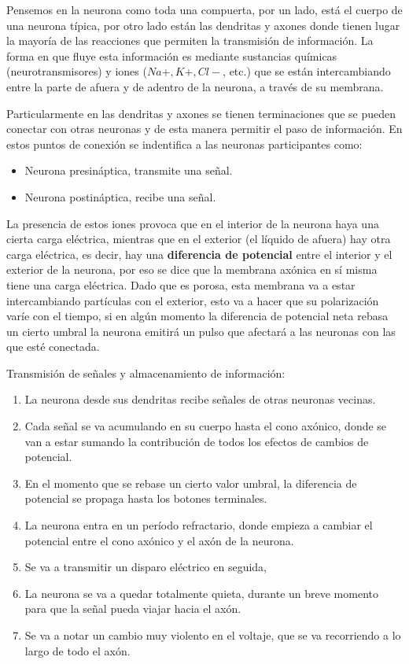  Pensemos en la neurona como toda una compuerta, por un lado, está el cuerpo de una neurona típica, por otro lado están las dendritas y axones donde tienen lugar la mayoría de las reacciones que permiten la transmisión de información.  La forma en que fluye esta información es mediante sustancias químicas (neurotransmisores) y iones ($Na+, K+, Cl-$, etc.) que se están intercambiando entre la parte de afuera y de adentro de la neurona, a través de su membrana.
 
 Particularmente en las dendritas y axones se tienen terminaciones que se pueden conectar con otras neuronas y de esta manera permitir el paso de información. En estos puntos de conexión se indentifica a las neuronas participantes como:
 
 \begin{itemize}
  \item Neurona presináptica, transmite una señal.
  \item Neurona postináptica, recibe una señal.
 \end{itemize}  
 
La presencia de estos iones provoca que en el interior de la neurona haya una cierta carga eléctrica, mientras que en el exterior (el líquido de afuera) hay otra carga eléctrica, es decir, hay una \textbf{diferencia de potencial} entre el interior y el exterior de la neurona, por eso se dice que la membrana axónica en sí misma tiene una carga eléctrica. Dado que es porosa, esta membrana  va a estar intercambiando partículas con el exterior, esto va a hacer que su polarización varíe con el tiempo, si en algún momento la diferencia de potencial neta rebasa un cierto umbral la neurona emitirá un pulso que afectará a las neuronas con las que esté conectada.




Transmisión de señales y almacenamiento de información:


\begin{enumerate}
 \item La neurona desde sus dendritas recibe señales de otras neuronas vecinas.
 \item Cada señal se va acumulando en su cuerpo hasta el cono axónico, donde se van a estar sumando la contribución de todos los efectos de cambios de potencial.
 \item En el momento que se rebase un cierto valor umbral, la diferencia de potencial se propaga hasta los botones terminales.
 \item La neurona entra en un período refractario, donde empieza a cambiar el potencial entre el cono axónico y el axón de la neurona.
 \item Se va a transmitir un disparo eléctrico en seguida,
 \item La neurona se va a quedar totalmente quieta, durante un breve momento para que la señal pueda viajar hacia el axón.
 \item Se va a notar un cambio muy violento en el voltaje, que se va recorriendo a lo largo de todo el axón. 
\end{enumerate}



